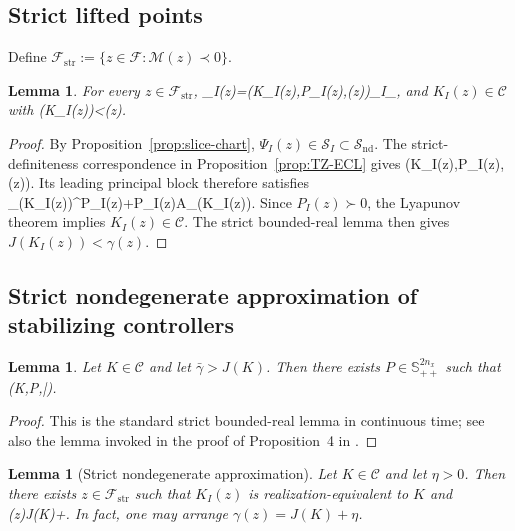 \documentclass[letterpaper,10pt,conference]{ieeeconf}
\def\[#1\]{\begin{align*}#1\end{align*}}
\providecommand{\Sbb}{\mathbb{S}}
\providecommand{\cC}{\mathcal{C}}
\providecommand{\cF}{\mathcal{F}}
\providecommand{\cS}{\mathcal{S}}
\providecommand{\cM}{\mathcal{M}}
\renewcommand{\^}[1]{^{(#1)}}
\newtheorem{lemma}[theorem]{Lemma}
\begin{document}
\subsection{Strict lifted points}

Define $
\cF_{\mathrm{str}}:=\{z\in\cF:\cM(z)\prec0\}$.

\begin{lemma}\label{lem:strict-lifted}
For every $z\in\cF_{\mathrm{str}}$,
\[
\Psi_I(z)=\bigl(K_I(z),P_I(z),\gamma(z)\bigr)\in \cS_I\subset \cS_{},
\]
and $K_I(z)\in\cC$ with
\[
J\bigl(K_I(z)\bigr)<\gamma(z).
\]
\end{lemma}

\begin{proof}
By Proposition~\ref{prop:slice-chart}, $\Psi_I(z)\in\cS_I\subset\cS_{\mathrm{nd}}$. The strict-definiteness correspondence in Proposition~\ref{prop:TZ-ECL} gives
\[
N\bigl(K_I(z),P_I(z),\gamma(z)\bigr).
\]
Its leading principal block therefore satisfies
\[
A_{}(K_I(z))^\top P_I(z)+P_I(z)A_{}(K_I(z)).
\]
Since $P_I(z)\succ0$, the Lyapunov theorem implies $K_I(z)\in\cC$. The strict bounded-real lemma then gives $J(K_I(z))<\gamma(z)$.
\end{proof}

\subsection{Strict nondegenerate approximation of stabilizing controllers}

\begin{lemma}\label{lem:strict-brl}
Let $K\in\cC$ and let $\bar\gamma>J(K)$. Then there exists $P\in\Sbb^{2n_x}_{++}$ such that
\[
N(K,P,\bar\gamma).
\]
\end{lemma}

\begin{proof}
This is the standard strict bounded-real lemma in continuous time; see also the lemma invoked in the proof of Proposition~4 in \citet{tang2023global}.
\end{proof}

\begin{lemma}[Strict nondegenerate approximation]\label{lem:strict-approx}
Let $K\in\cC$ and let $\eta>0$. Then there exists $z\in\cF_{\mathrm{str}}$ such that $K_I(z)$ is realization-equivalent to $K$ and
\[
\gamma(z)\le J(K)+\eta.
\]
In fact, one may arrange $\gamma(z)=J(K)+\eta$.
\end{lemma}
\end{document}
